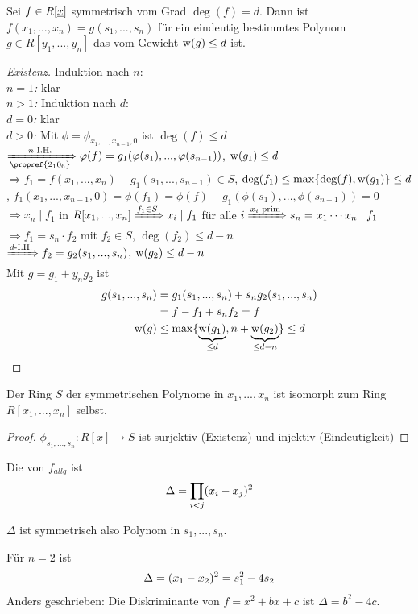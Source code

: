 \begin{theorem}
	Sei $f\in R[\uline{x}]$ symmetrisch vom Grad $\deg(f)=d$. Dann ist $f(x_1,...,x_n)=g(s_1,...,s_n)$ für ein eindeutig bestimmtes Polynom $g\in R[y_1,...,y_n]$ das vom Gewicht $\operatorname{w}(g)\le d$ ist.
\end{theorem}
\begin{proof}[Existenz]
	Induktion nach $n$: \\
	\emph{$n=1$:} klar \\
	\emph{$n>1$:} Induktion nach $d$: \\
	\emph{$d=0$:} klar \\
	\emph{$d>0$:} Mit $\phi = \phi_{x_1,...,x_{n-1},0}$ ist $\deg(f)\le d$ \\
	$\xRightarrow[\propref{2_10_6}]{n\text{-I.H.}} \phi(f)=g_1(\phi(s_1),...,\phi(s_{n-1}))$, $\operatorname{w}(g_1)\le d$ \\
	$\Rightarrow f_1 = f(x_1,...,x_n)-g_1(s_1,...,s_{n-1})\in S$, $\deg(f_1)\le\max\{\deg(f),\operatorname{w}(g_1)\}\le d$, $f_1(x_1,...,x_{n-1},0) = \phi(f_1) = \phi(f) - g_1(\phi(s_1),...,\phi(s_{n-1})) = 0$ \\
	$\Rightarrow x_n\mid f_1$ in $R[x_1,...,x_n]\xRightarrow{f_1\in S} x_i\mid f_1$ für alle $i\xRightarrow{x_i\text{ prim}} s_n=x_1\cdots x_n\mid f_1$ \\
	$\Rightarrow f_1 = s_n\cdot f_2$ mit $f_2\in S$, $\deg(f_2)\le d-n$ \\
	$\xRightarrow{d\text{-I.H.}} f_2=g_2(s_1,...,s_n)$, $\operatorname{w}(g_2)\le d-n$ \\
	Mit $g=g_1+y_ng_2$ ist
	\begin{align}
		g(s_1,...,s_n) &= g_1(s_1,...,s_n)+s_ng_2(s_1,...,s_n) \notag \\
		&= f-f_1 + s_nf_2 = f \notag \\
		\operatorname{w}(g) &\le \max\{\underbrace{\operatorname{w}(g_1)}_{\le d},n+\underbrace{\operatorname{w}(g_2)}_{\le d-n}\} \le d\notag
	\end{align}
\end{proof}

\begin{conclusion}
	Der Ring $S$ der symmetrischen Polynome in $x_1,...,x_n$ ist isomorph zum Ring $R[x_1,...,x_n]$ selbst.
\end{conclusion}
\begin{proof}
	$\phi_{s_1,...,s_{n}}:R[x]\to S$ ist surjektiv (Existenz) und injektiv (Eindeutigkeit)
\end{proof}

\begin{definition}[Diskriminante]
	Die  von $f_{allg}$ ist
	\begin{align}
		\Delta = \prod_{i<j} (x_i-x_j)^2 \notag
	\end{align}
\end{definition}

\begin{remark}
	$\Delta$ ist symmetrisch also Polynom in $s_1,...,s_n$.
\end{remark}

\begin{example}
	Für $n=2$ ist
	\begin{align}
		\Delta = (x_1-x_2)^2 = s_1^2 - 4s_2\notag
	\end{align}
	Anders geschrieben: Die Diskriminante  von $f=x^2+bx+c$ ist $\Delta = b^2-4c$.
\end{example}